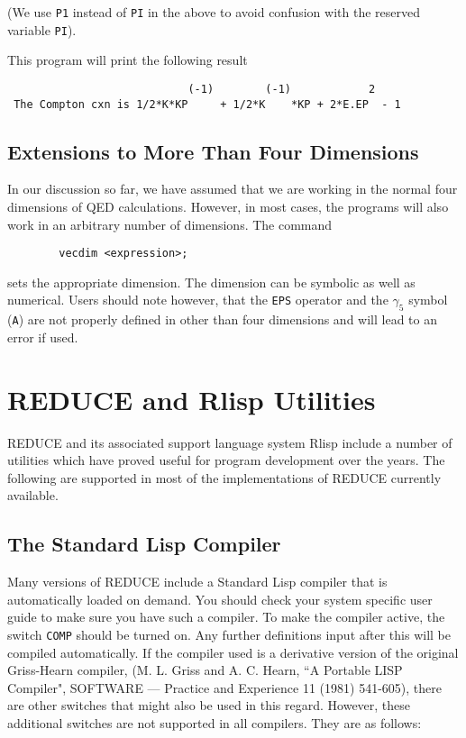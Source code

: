\documentclass[11pt,letterpaper]{book}
\makeatletter
\newcommand{\REDUCE}{REDUCE}
\newcommand{\underscore}{\_}
\newcommand{\ttindex}[1]{{\renewcommand{\_}{\protect\underscore}%
                          \index{#1@{\tt #1}}}}
\makeatother
\begin{document}
(We use {\tt P1} instead of {\tt PI} in the above to avoid confusion with
the reserved variable {\tt PI}).

This program will print the following result
{\small\begin{verbatim}
                            (-1)        (-1)            2
 The Compton cxn is 1/2*K*KP     + 1/2*K    *KP + 2*E.EP  - 1
\end{verbatim}}

\section{Extensions to More Than Four Dimensions}

In our discussion so far, we have assumed that we are working in the
normal four dimensions of QED calculations. However, in most cases, the
programs will also work in an arbitrary number of dimensions. The command
\ttindex{VECDIM}
{\small\begin{verbatim}
        vecdim <expression>;
\end{verbatim}}
sets the appropriate dimension. The dimension can be symbolic as well as
numerical. Users should note however, that the {\tt EPS} operator and the
$\gamma_{5}$ symbol ({\tt A}) are not properly defined in other than four
dimensions and will lead to an error if used.

\chapter{{\REDUCE} and Rlisp Utilities}

{\REDUCE} and its associated support language system Rlisp
include a number of utilities which have proved useful for program
development over the years.  The following are supported in most of the
implementations of {\REDUCE} currently available.

\section{The Standard Lisp Compiler}

Many versions of {\REDUCE} include a Standard Lisp compiler that is
automatically loaded on demand.  You should check your system specific
user guide to make sure you have such a compiler.  To make the compiler
active, the switch {\tt COMP}\ttindex{COMP} should be turned on.  Any
further definitions input after this will be compiled automatically.  If
the compiler used is a derivative version of the original Griss-Hearn
compiler,
(M. L. Griss and A.
C. Hearn, ``A Portable LISP Compiler", SOFTWARE --- Practice and Experience
11 (1981) 541-605),
there are other switches that might also be
used in this regard.  However, these additional switches are not supported
in all compilers.  They are as follows:
\end{document}
